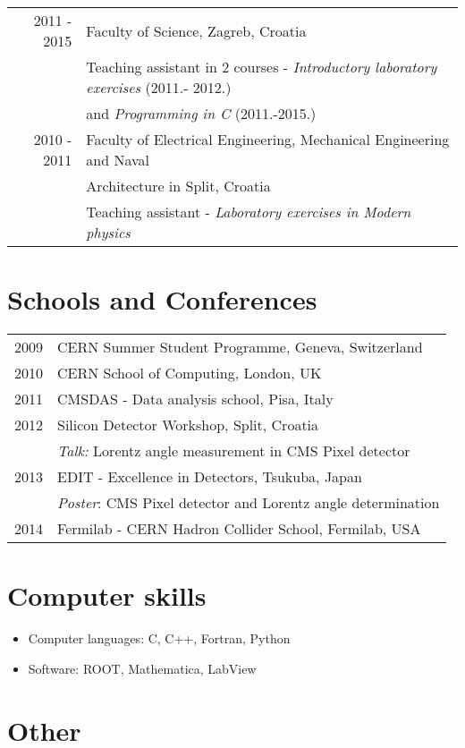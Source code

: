 \documentclass[letterpaper,12pt]{article}
\begin{document}
\begin{tabular}{r | l}
  2011 - 2015 & Faculty of Science, Zagreb, Croatia \\ & Teaching assistant in 2 courses - \textit{Introductory laboratory exercises} (2011.- 2012.) \\ & and \textit{Programming in C} (2011.-2015.) \\[5pt]
  2010 - 2011 & Faculty of Electrical Engineering, Mechanical Engineering and Naval \\ & Architecture in Split, Croatia \\ & Teaching assistant - \textit{Laboratory exercises in Modern physics} 
\end{tabular}

\section*{Schools and Conferences}

\begin{tabular}{r | l}
  2009 & CERN Summer Student Programme, Geneva, Switzerland \\[5pt]
  2010 & CERN School of Computing, London, UK \\[5pt]
  2011 & CMSDAS - Data analysis school, Pisa, Italy \\[5pt]
  2012 & Silicon Detector Workshop, Split, Croatia \\
  	   & \textit{Talk:} Lorentz angle measurement in CMS Pixel detector\\[5pt] 
  2013 & EDIT - Excellence in Detectors, Tsukuba, Japan \\
  	   & \textit{Poster}: CMS Pixel detector and Lorentz angle determination \\[5pt]
  2014 & Fermilab - CERN Hadron Collider School, Fermilab, USA\\
\end{tabular}

\section*{Computer skills}
\begin{itemize}
\item Computer languages: C, C++, Fortran, Python 
\item Software: ROOT, Mathematica, LabView
\end{itemize}

\section*{Other}
\end{document}

